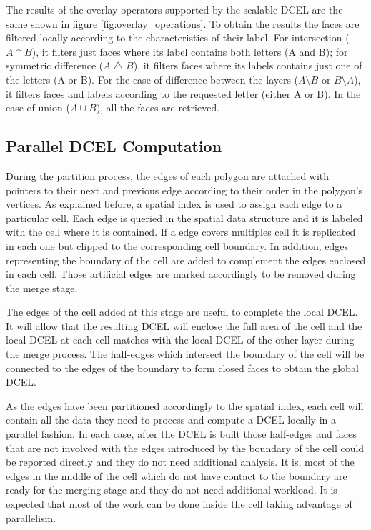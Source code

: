 The results of the overlay operators supported by the scalable DCEL are the same shown in figure \ref{fig:overlay_operations}.  To obtain the results the faces are filtered locally according to the characteristics of their label.  For intersection ($A \cap B$), it filters just faces where its label contains both letters (A and B); for symmetric difference ($A \bigtriangleup B$), it filters faces where its labels contains just one of the letters (A or B).  For the case of difference between the layers ($A \setminus B$ or $B \setminus A$), it filters faces and labels according to the requested letter (either A or B). In the case of union ($A \cup B$), all the faces are retrieved. 

\subsection{Parallel DCEL Computation}

During the partition process, the edges of each polygon are attached with pointers to their next and previous edge according to their order in the polygon's vertices.  As explained before, a spatial index is used to assign each edge to a particular cell.  Each edge is queried in the spatial data structure and it is labeled with the cell where it is contained.  If a edge covers multiples cell it is replicated in each one but clipped to the corresponding cell boundary.  In addition, edges representing the boundary of the cell are added to complement the edges enclosed in each cell.  Those artificial edges are marked accordingly to be removed during the merge stage.

The edges of the cell added at this stage are useful to complete the local DCEL.  It will allow that the resulting DCEL will enclose the full area of the cell and the local DCEL at each cell matches with the local DCEL of the other layer during the merge process.  The half-edges which intersect the boundary of the cell will be connected to the edges of the boundary to form closed faces to obtain the global DCEL.

As the edges have been partitioned accordingly to the spatial index, each cell will contain all the data they need to process and compute a DCEL locally in a parallel fashion. In each case, after the DCEL is built those half-edges and faces that are not involved with the edges introduced by the boundary of the cell could be reported directly and they do not need additional analysis.  It is, most of the edges in the middle of the cell which do not have contact to the boundary are ready for the merging stage and they do not need additional workload.  It is expected that most of the work can be done inside the cell taking advantage of parallelism.

